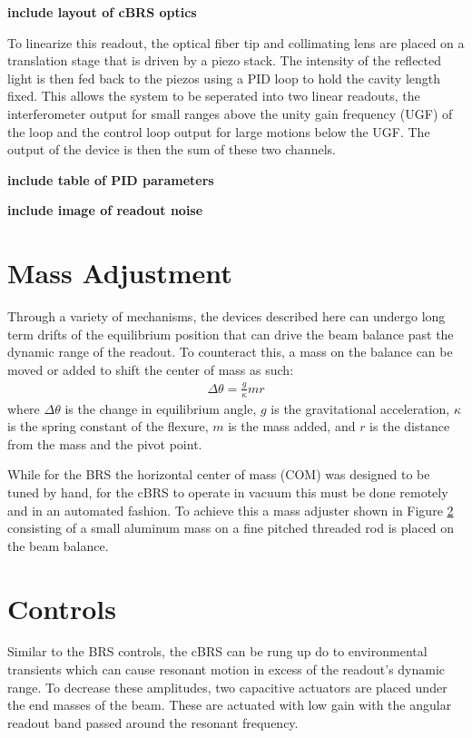 \documentclass [12pt, proquest]{uwthesis}[2019]
\begin{document}
\textbf{include layout of cBRS optics}

To linearize this readout, the optical fiber tip and collimating lens are placed on a translation stage that is driven by a piezo stack. The intensity of the reflected light is then fed back to the piezos using a PID loop to hold the cavity length fixed. This allows the system to be seperated into two linear readouts, the interferometer output for small ranges above the unity gain frequency (UGF) of the loop and the control loop output for large motions below the UGF. The output of the device is then the sum of these two channels.

\textbf{include table of PID parameters}

\textbf{include image of readout noise}

\section{Mass Adjustment}

Through a variety of mechanisms, the devices described here can undergo long term drifts of the equilibrium position that can drive the beam balance past the dynamic range of the readout. To counteract this, a mass on the balance can be moved or added to shift the center of mass as such:
\begin{align}
\Delta \theta=\frac{g}{\kappa} m r
\end{align}
where $\Delta \theta$ is the change in equilibrium angle, $g$ is the gravitational acceleration, $\kappa$ is the spring constant of the flexure, $m$ is the mass added, and $r$ is the distance from the mass and the pivot point.

While for the BRS the horizontal center of mass (COM) was designed to be tuned by hand, for the cBRS to operate in vacuum this must be done remotely and in an automated fashion. To achieve this a mass adjuster shown in Figure \ref{} consisting of a small aluminum mass on a fine pitched threaded rod is placed on the beam balance.

\section{Controls}

Similar to the BRS controls, the cBRS can be rung up do to environmental transients which can cause resonant motion in excess of the readout's dynamic range. To decrease these amplitudes, two capacitive actuators are placed under the end masses of the beam. These are actuated with low gain with the angular readout band passed around the resonant frequency. 
\end{document}
